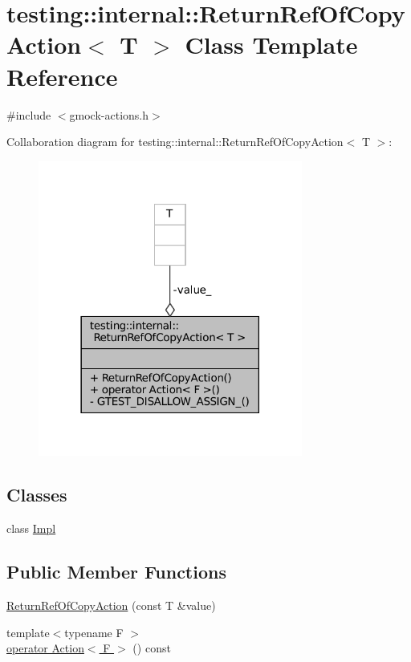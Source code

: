 \hypertarget{classtesting_1_1internal_1_1ReturnRefOfCopyAction}{}\section{testing\+:\+:internal\+:\+:Return\+Ref\+Of\+Copy\+Action$<$ T $>$ Class Template Reference}
\label{classtesting_1_1internal_1_1ReturnRefOfCopyAction}


{\ttfamily \#include $<$gmock-\/actions.\+h$>$}



Collaboration diagram for testing\+:\+:internal\+:\+:Return\+Ref\+Of\+Copy\+Action$<$ T $>$\+:
\nopagebreak
\begin{figure}[H]
\begin{center}
\leavevmode
\includegraphics[width=246pt]{classtesting_1_1internal_1_1ReturnRefOfCopyAction__coll__graph}
\end{center}
\end{figure}
\subsection*{Classes}
\begin{DoxyCompactItemize}
\item 
class \hyperlink{classtesting_1_1internal_1_1ReturnRefOfCopyAction_1_1Impl}{Impl}
\end{DoxyCompactItemize}
\subsection*{Public Member Functions}
\begin{DoxyCompactItemize}
\item 
\hyperlink{classtesting_1_1internal_1_1ReturnRefOfCopyAction_a073c18a8b50423b08f6603e860622839}{Return\+Ref\+Of\+Copy\+Action} (const T \&value)
\item 
{\footnotesize template$<$typename F $>$ }\\\hyperlink{classtesting_1_1internal_1_1ReturnRefOfCopyAction_a8b4829fbb46c3ca6468f3eb5c5b42493}{operator Action$<$ F $>$} () const
\end{DoxyCompactItemize}
